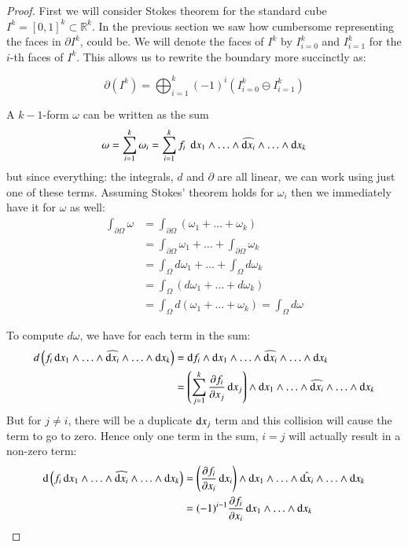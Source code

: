 \begin{proof}

First we will consider Stokes theorem for the standard cube $I^k = [0,1]^k \subset \mathbb{R}^k$.
In the previous section we saw how cumbersome representing the faces in $\partial I^k$, could be.
We will denote the faces of $I^k$ by $I^k_{i=0}$ and $I^k_{i=1}$ for the $i$-th faces of $I^k$.
This allows us to rewrite the boundary more succinctly as:


\begin{equation}
	\partial (I^k) = \bigoplus_{i=1}^k (-1)^i \left( I^k_{i=0} \ominus I^k_{i=1} \right) 
\end{equation}



A $k-1$-form $\omega$ can be written as the sum
\begin{equation}
	\omega 
		= \sum_{i=1}^k \omega_i 
		= \sum_{i=1}^k f_i \; \mathop{}\!\mathrm{d} x_1 \wedge \ldots \wedge \widehat{\mathop{}\!\mathrm{d} x_i} \wedge  \ldots \wedge \mathop{}\!\mathrm{d} x_k
\end{equation}
but since everything: the integrals, $d$ and $\partial$ are all linear, we can work using just one of these terms.
Assuming Stokes' theorem holds for $\omega_i$ then we immediately have it for $\omega$ as well:
\begin{align*}
	\int_{\partial\Omega} \omega 
	&= \int_{\partial \Omega} (\omega_1 + \ldots + \omega_k) \\
	&= \int_{\partial\Omega} \omega_1 + \ldots + \int_{\partial\Omega} \omega_k  \\
	&= \int_{\Omega} d\omega_1 + \ldots + \int_\Omega d\omega_k \\
	&= \int_\Omega (d\omega_1 + \ldots + d\omega_k)\\
	&= \int_\Omega d(\omega_1 + \ldots + \omega_k) = \int_\Omega d\omega
\end{align*}



To compute $d\omega$, we have for each term in the sum:
\begin{align*}
	d \left( f_i \diff x_1 \wedge \ldots \wedge \widehat{\diff x_i} \wedge  \ldots \wedge \diff x_k \right) 
 		&= \diff f_i \wedge \diff x_1 \wedge \ldots \wedge \widehat{\diff x_i} \wedge  \ldots \wedge \diff x_k \\ 
 		&= \left( \sum_{j=1}^k \frac{\partial f_i}{\partial x_j} \diff x_j \right)
 			\wedge \diff x_1 \wedge \ldots \wedge \widehat{\diff x_i} \wedge  \ldots \wedge \diff x_k
\end{align*}
But for $j \neq i$, there will be a duplicate $\mathop{}\!\mathrm{d} x_j$ term and this collision will cause the term to go to zero.
Hence only one term in the sum, $i=j$ will actually result in a non-zero term:
\begin{align*}
	\diff \left( f_i \diff x_1 \wedge \ldots \wedge \widehat{\diff x_i} \wedge  \ldots \wedge \diff x_k \right) 
 		&= \left(\frac{\partial f_i}{\partial x_i} \diff x_i \right)
 			\wedge \diff x_1 \wedge \ldots \wedge \hat{\diff x_i} \wedge  \ldots \wedge \diff x_k \\ 
		&= (-1)^{i-1} \frac{\partial f_i}{\partial x_i}
 			 \diff x_1 \wedge \ldots \wedge \diff x_k
\end{align*}




\end{proof}
